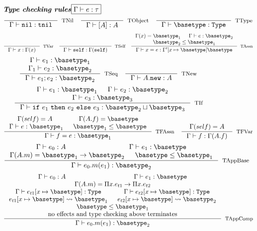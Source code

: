 \documentclass{article}
\def\emphbf#1{\textbf{\emph{#1}}}
\newcommand{\judgementHead}[2]{\ensuremath{\emphbf{#1}\hfill\fbox{#2}}}
\newcommand{\teval}[3]{\ensuremath{#1 \vdash #2:#3}}
\newcommand{\eeval}[2]{\ensuremath{#1 \rightsquigarrow #2}}
\newcommand{\subst}[2]{\ensuremath{[ #1 \mapsto #2 ]}}
\newcommand\trspace{\vspace{0.8em}}
\newcommand{\subtype}[2]{\ensuremath{#1\leq #2}}
\newcommand\expr{\ensuremath{e}\xspace}
\newcommand\type{\tau}
\newcommand\deptype{\ensuremath{\Pi\var.\expr}}
\newcommand\var{\ensuremath{x}\xspace}
\newcommand\tnil{\texttt{tnil}\xspace}
\newcommand\vnil{\texttt{nil}\xspace}
\newcommand\vinst[1]{\ensuremath{[#1]}\xspace}
\newcommand\eseq[2]{\ensuremath{#1 ; #2}\xspace}
\newcommand\eassn[2]{\ensuremath{#1 = #2}\xspace}
\newcommand\eif[3]{\ensuremath{\texttt{if}\ #1\ \texttt{then}\ #2\ \texttt{else}\ #3}\xspace}
\newcommand\eself{\texttt{self}\xspace}
\newcommand\emethcall[3]{\ensuremath{#1.#2(#3)}\xspace}
\newcommand\efield{\ensuremath{f}\xspace}
\newcommand\enew[1]{\ensuremath{#1 . \texttt{new}}\xspace}
\newcommand\mthtype[2]{\ensuremath{#1 \rightarrow #2}\xspace}
\begin{document}
\begin{figure}
\centering
\judgementHead{Type checking rules}{\teval{\Gamma}{\expr}{\type}}
$$
\inference{}{\teval{\Gamma}{\vnil}{\tnil}}[TNil]
\quad
\inference{}{\teval{\Gamma}{\vinst{A}}{A}}[TObject]
\quad
\inference{}{\teval{\Gamma}{\basetype}{\texttt{Type}}}[TType]
$$
\trspace
$$
\inference{}{\teval{\Gamma}{\var}{\Gamma(\var)}}[TVar]
\quad
\inference{}{\teval{\Gamma}{\eself}{\Gamma(\eself)}}[TSelf]
\quad
\inference{\Gamma(\var) = \basetype_1 &&
\teval{\Gamma}{\expr}{\basetype_2} \\
\subtype{\basetype_2}{\basetype_1}}
{\teval{\Gamma}{\eassn{\var}{\expr}}{\Gamma'\subst{\var}{\basetype}}{\basetype}}[TAssn]
$$
\trspace
$$
\inference{\teval{\Gamma}{\expr_1}{\basetype_1} \\
\teval{\Gamma_1}{\expr_2}{\basetype_2}}
{\teval{\Gamma}{\eseq{\expr_1}{\expr_2}}{\basetype_2}}[TSeq]
\quad
\inference{}{\teval{\Gamma}{\enew{A}}{A}}[TNew]
$$
\trspace
$$
\inference{\teval{\Gamma}{\expr_1}{\basetype_1} &&
\teval{\Gamma}{\expr_2}{\basetype_2} \\
\teval{\Gamma}{\expr_3}{\basetype_3}}
{\teval{\Gamma}{\eif{\expr_1}{\expr_2}{\expr_3}}{\basetype_2\sqcup\basetype_3}}[TIf]
$$
\trspace
$$
\inference{\Gamma(self) = A && \Gamma(A.\efield) = \basetype \\
\teval{\Gamma}{\expr}{\basetype_1} && \subtype{\basetype_1}{\basetype}}
{\teval{\Gamma}{\eassn{\efield}{\expr}}{\basetype_1}}[TFAssn]
\quad
\inference{\Gamma(self) = A}
{\teval{\Gamma}{\efield}{\Gamma(A.\efield)}}[TFVar]
$$
\trspace
$$
\inference{\teval{\Gamma}{\expr_0}{A} &&
\teval{\Gamma}{\expr_1}{\basetype} \\
\Gamma(A.m) = \mthtype{\basetype_1}{\basetype_2} &&
\subtype{\basetype}{\basetype_1}
}
{\teval{\Gamma}{\emethcall{\expr_0}{m}{\expr_1}}{\basetype_2}}[TAppBase] 
$$
\trspace
$$
\inference{\teval{\Gamma}{\expr_0}{A} &&
\teval{\Gamma}{\expr_1}{\basetype} \\
\Gamma(A.m) = \mthtype{\deptype_{t1}}{\deptype_{t2}} \\
\teval{\Gamma}{\expr_{t1}\subst{\var}{\basetype}}{\texttt{Type}} &&
\teval{\Gamma}{\expr_{t2}\subst{\var}{\basetype}}{\texttt{Type}}\\
\eeval{\expr_{t1}\subst{\var}{\basetype}}{\basetype_1} &&
\eeval{\expr_{t2}\subst{\var}{\basetype}}{\basetype_2} \\
\subtype{\basetype}{\basetype_1} \\
\textnormal{no effects and type checking above terminates}
}
{\teval{\Gamma}{\emethcall{\expr_0}{m}{\expr_1}}{\basetype_2}}[TAppComp]
$$
\end{figure}
\end{document}
